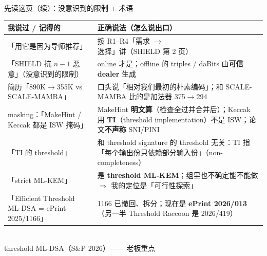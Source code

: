 \documentclass[aspectratio=169,10pt,fontset=none]{ctexbeamer}
\begin{document}
\begin{frame}{先读这页（续）：没意识到的限制 + 术语}
{\small\renewcommand{\arraystretch}{1.2}
\begin{tabularx}{\textwidth}{@{}p{4.4cm}Y@{}}\toprule
\textbf{我说过 / 记得的} & \textbf{正确说法（怎么说出口）} \\\midrule
「用它是因为导师推荐」 & 按 R1--R4「需求 $\to$ 选择」讲（SHIELD 第 2 页）\\
「SHIELD 抗 $n-1$ 恶意」（没意识到的限制）& \alert{online 才是}；offline 的 triples / daBits 由\textbf{可信 dealer} 生成 \\
简历「890K$\to$355K vs SCALE-MAMBA」 & 口头说「相对我们最初的朴素编码」；和 SCALE-MAMBA 比的是加法器 375$\to$294 \\
masking：「MakeHint / Keccak 都是 ISW 掩码」 & MakeHint \textbf{明文算}（检查全过并合并后）；Keccak 用 \textbf{TI}（threshold implementation）不是 ISW；论文\textbf{不声称} SNI/PINI \\
「TI 的 threshold」 & \alert{和 threshold signature 的 threshold 无关}：TI 指「每个输出份只依赖部分输入份」（non-completeness）\\
「strict ML-KEM」 & 是 \textbf{threshold ML-KEM}；组里也不确定能不能做 $\Rightarrow$ 我的定位是「可行性探索」\\
「Efficient Threshold ML-DSA = ePrint 2025/1166」 & 1166 已撤回、拆分；现在是 \textbf{ePrint 2026/013}（另一半 Threshold Raccoon 是 2026/419）\\
\bottomrule
\end{tabularx}}
\end{frame}
\begin{frame}
\vfill{}\\[6pt]{\normalsize threshold ML-DSA（S\&P 2026）—— 老板重点}\vfill
\end{frame}
\end{document}

